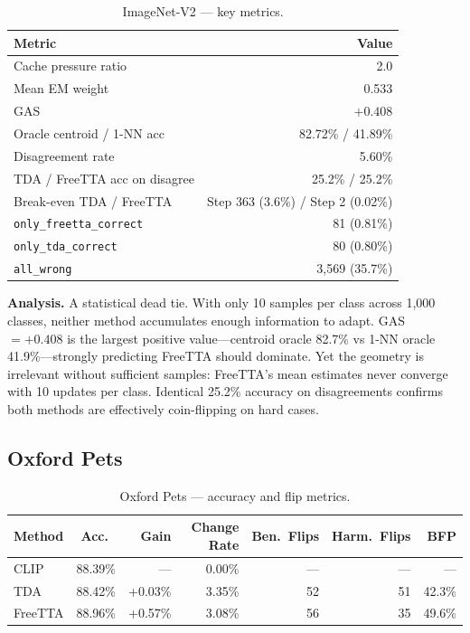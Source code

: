 \documentclass[12pt,a4paper]{article}
\newcommand{\1}{\mathbf{1}}
\begin{document}
\begin{table}[H]
\centering
\caption{ImageNet-V2 --- key metrics.}
\label{tab:imagenet_internal}
\begin{tabular}{@{}lr@{}}
\toprule
Metric & Value \\
\midrule
Cache pressure ratio         & 2.0 \\
Mean EM weight               & 0.533 \\
GAS                          & $+0.408$ \\
Oracle centroid / 1-NN acc   & 82.72\% / 41.89\% \\
Disagreement rate            & 5.60\% \\
TDA / FreeTTA acc on disagree & 25.2\% / 25.2\% \\
Break-even TDA / FreeTTA     & Step 363 (3.6\%) / Step 2 (0.02\%) \\
\texttt{only\_freetta\_correct} & 81 (0.81\%) \\
\texttt{only\_tda\_correct}     & 80 (0.80\%) \\
\texttt{all\_wrong}             & 3,569 (35.7\%) \\
\bottomrule
\end{tabular}
\end{table}

\textbf{Analysis.}
A statistical dead tie.
With only 10 samples per class across 1,000 classes, neither method accumulates enough information to adapt.
GAS $= +0.408$ is the largest positive value---centroid oracle 82.7\% vs 1-NN oracle 41.9\%---strongly predicting FreeTTA should dominate.
Yet the geometry is irrelevant without sufficient samples: FreeTTA's mean estimates never converge with 10 updates per class.
Identical 25.2\% accuracy on disagreements confirms both methods are effectively coin-flipping on hard cases.

\subsection{Oxford Pets}

\begin{table}[H]
\centering
\caption{Oxford Pets --- accuracy and flip metrics.}
\label{tab:pets_flip}
\begin{tabular}{@{}lrrrrrr@{}}
\toprule
Method & Acc.\ & Gain & Change Rate & Ben.\ Flips & Harm.\ Flips & BFP \\
\midrule
CLIP    & 88.39\% & ---     & 0.00\% & ---  & ---  & --- \\
TDA     & 88.42\% & +0.03\% & 3.35\% & 52   & 51   & 42.3\% \\
FreeTTA & 88.96\% & +0.57\% & 3.08\% & 56   & 35   & 49.6\% \\
\bottomrule
\end{tabular}
\end{table}
\end{document}
